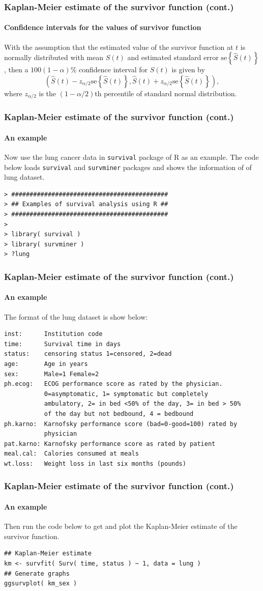 \documentclass{beamer}
\begin{document}
	\begin{frame}
		\frametitle{Kaplan-Meier estimate of the survivor function (cont.)}
		\framesubtitle{Confidence intervals for the values of survivor function}
		With the assumption that the estimated value of the survivor function at $t$ is normally distributed with mean $S( t )$ and estimated standard error $\text{se}\left\{ \hat{ S }( t ) \right\}$, then a $100( 1 - \alpha)\%$ confidence interval for $S( t )$ is given by
		\[ \left( \hat{ S }( t ) - z_{ \alpha / 2 } \text{se}\left\{ \hat{ S }( t ) \right\}, \hat{ S }( t ) + z_{ \alpha / 2 } \text{se}\left\{ \hat{ S }( t ) \right\} \right), \]
		where $z_{ \alpha / 2 }$ is the $( 1 - \alpha / 2 )$th percentile of standard normal distribution.
	\end{frame}
	
	\begin{frame}[fragile]
		\frametitle{Kaplan-Meier estimate of the survivor function (cont.)}
		\framesubtitle{An example}
		Now use the lung cancer data in \texttt{survival} package of R as an example.
		The code below loads \texttt{survival} and \texttt{survminer} packages and shows the information of of lung dataset.
		\begin{Verbatim}
> ###########################################
> ## Examples of survival analysis using R ##
> ###########################################
> 
> library( survival )
> library( survminer )
> ?lung
		\end{Verbatim}
	\end{frame}
	
		\begin{frame}[fragile]
		\frametitle{Kaplan-Meier estimate of the survivor function (cont.)}
		\framesubtitle{An example}
		The format of the lung dataset is show below:
		\begin{Verbatim}[fontsize=\small]
inst:      Institution code
time:      Survival time in days
status:    censoring status 1=censored, 2=dead
age:       Age in years
sex:       Male=1 Female=2
ph.ecog:   ECOG performance score as rated by the physician. 
           0=asymptomatic, 1= symptomatic but completely
           ambulatory, 2= in bed <50% of the day, 3= in bed > 50% 
           of the day but not bedbound, 4 = bedbound
ph.karno:  Karnofsky performance score (bad=0-good=100) rated by 
           physician
pat.karno: Karnofsky performance score as rated by patient
meal.cal:  Calories consumed at meals
wt.loss:   Weight loss in last six months (pounds)
		\end{Verbatim}
	\end{frame}
	\begin{frame}[fragile]
		\frametitle{Kaplan-Meier estimate of the survivor function (cont.)}
		\framesubtitle{An example}
		Then run the code below to get and plot the Kaplan-Meier estimate of the survivor function. 
		\begin{Verbatim}[fontsize=\small]
## Kaplan-Meier estimate 
km <- survfit( Surv( time, status ) ~ 1, data = lung )
## Generate graphs
ggsurvplot( km_sex )
		\end{Verbatim}
	\end{frame}
	
\end{document}
